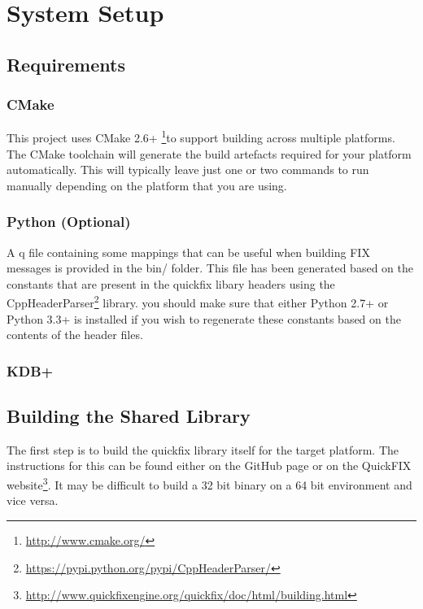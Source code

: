 \chapter{System Setup}


\section{Requirements}

\subsection{CMake}
This project uses CMake 2.6+ \footnote{\url{http://www.cmake.org/}}to support building across multiple platforms. The CMake toolchain will generate the build artefacts required for your platform automatically. This will typically leave just one or two commands to run manually depending on the platform that you are
using.

\subsection{Python (Optional)}
A q file containing some mappings that can be useful when building FIX messages is provided in the bin/ folder. This file has been generated based on the constants that are present in the quickfix libary headers using the CppHeaderParser\footnote{\url{https://pypi.python.org/pypi/CppHeaderParser/}} library. you should make sure that either Python 2.7+ or Python 3.3+ is installed if you wish to regenerate these constants based on the contents of the header files.

\subsection{KDB+}

\section{Building the Shared Library}

The first step is to build the quickfix library itself for the target platform. The instructions for this can be found either on the GitHub page or on the QuickFIX website\footnote{\url{http://www.quickfixengine.org/quickfix/doc/html/building.html}}. It may be difficult to build a 32 bit binary on a 64 bit environment and vice versa. 

